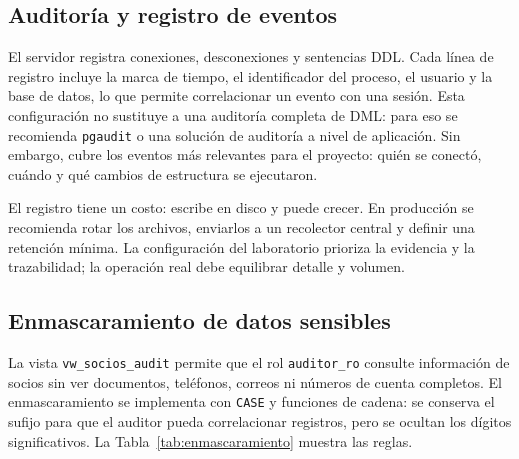 \subsection{Auditoría y registro de eventos}

El servidor registra conexiones, desconexiones y sentencias DDL. Cada línea
de registro incluye la marca de tiempo, el identificador del proceso, el
usuario y la base de datos, lo que permite correlacionar un evento con una
sesión. Esta
configuración no sustituye a una auditoría completa de DML: para eso se
recomienda \texttt{pgaudit} o una solución de auditoría a nivel de aplicación.
Sin embargo, cubre los eventos más relevantes para el proyecto: quién se
conectó, cuándo y qué cambios de estructura se ejecutaron.

El registro tiene un costo: escribe en disco y puede crecer. En producción se
recomienda rotar los archivos, enviarlos a un recolector central y definir una
retención mínima. La configuración del laboratorio prioriza la evidencia y la
trazabilidad; la operación real debe equilibrar detalle y volumen.

\subsection{Enmascaramiento de datos sensibles}

La vista \texttt{vw\_socios\_audit} permite que el rol \texttt{auditor\_ro}
consulte información de socios sin ver documentos, teléfonos, correos ni
números de cuenta completos. El enmascaramiento se implementa con
\texttt{CASE} y funciones de cadena: se conserva el sufijo para que el
auditor pueda correlacionar registros, pero se ocultan los dígitos
significativos. La Tabla~\ref{tab:enmascaramiento} muestra las reglas.

\begin{table}[H]
  \centering
  \caption{Reglas de enmascaramiento en \texttt{vw\_socios\_audit}}
  \label{tab:enmascaramiento}
\end{table}

